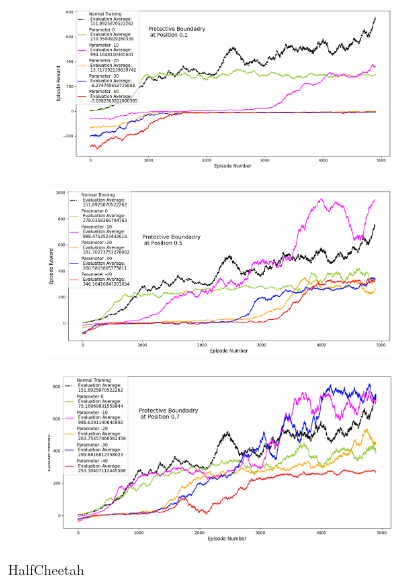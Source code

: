 \documentclass[journal]{IEEEtran}
\begin{document}
\begin{figure}
    \centering
    \begin{subfigure}[b]{0.5\textwidth}
      \centering
      \includegraphics[width=\textwidth]{Walker_with_Boundary_at_0.1.png}
    \end{subfigure}
    \vspace*{0.0mm}
    \begin{subfigure}[b]{0.5\textwidth}
      \centering
      \includegraphics[width=\textwidth]{Walker_with_Boundary_at_0.5.png}
    \end{subfigure}
    \vspace*{0.0mm}
    \begin{subfigure}[b]{0.5\textwidth}
      \centering
      \includegraphics[width=\textwidth]{Walker_with_Boundary_at_0.7.png}
    \end{subfigure}
    \caption{HalfCheetah}
    \label{fig:Cheetah}
\end{figure}
\end{document}

